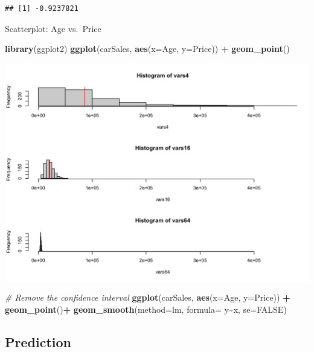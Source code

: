 \documentclass[
]{article}
\newenvironment{Shaded}{\begin{snugshade}}{\end{snugshade}}
\newcommand{\AttributeTok}[1]{\textcolor[rgb]{0.13,0.29,0.53}{#1}}
\newcommand{\CommentTok}[1]{\textcolor[rgb]{0.56,0.35,0.01}{\textit{#1}}}
\newcommand{\ConstantTok}[1]{\textcolor[rgb]{0.56,0.35,0.01}{#1}}
\newcommand{\FunctionTok}[1]{\textcolor[rgb]{0.13,0.29,0.53}{\textbf{#1}}}
\newcommand{\NormalTok}[1]{#1}
\newcommand{\SpecialCharTok}[1]{\textcolor[rgb]{0.81,0.36,0.00}{\textbf{#1}}}
\begin{document}
\begin{verbatim}
## [1] -0.9237821
\end{verbatim}

Scatterplot: Age vs.~Price

\begin{Shaded}
\begin{Highlighting}[]
\FunctionTok{library}\NormalTok{(ggplot2)}
\FunctionTok{ggplot}\NormalTok{(carSales, }\FunctionTok{aes}\NormalTok{(}\AttributeTok{x=}\NormalTok{Age, }\AttributeTok{y=}\NormalTok{Price)) }\SpecialCharTok{+} \FunctionTok{geom\_point}\NormalTok{()}
\end{Highlighting}
\end{Shaded}

\begin{center}\includegraphics[width=0.5\linewidth,height=0.5\textheight]{unnamed-chunk-38-1} \end{center}

\begin{Shaded}
\begin{Highlighting}[]
\CommentTok{\# Remove the confidence interval}
\FunctionTok{ggplot}\NormalTok{(carSales, }\FunctionTok{aes}\NormalTok{(}\AttributeTok{x=}\NormalTok{Age, }\AttributeTok{y=}\NormalTok{Price)) }\SpecialCharTok{+} 
  \FunctionTok{geom\_point}\NormalTok{()}\SpecialCharTok{+}
  \FunctionTok{geom\_smooth}\NormalTok{(}\AttributeTok{method=}\NormalTok{lm, }\AttributeTok{formula=}\NormalTok{ y}\SpecialCharTok{\textasciitilde{}}\NormalTok{x, }\AttributeTok{se=}\ConstantTok{FALSE}\NormalTok{)}
\end{Highlighting}
\end{Shaded}


\hypertarget{prediction-1}{%
\subsection{Prediction}\label{prediction-1}}
\end{document}
